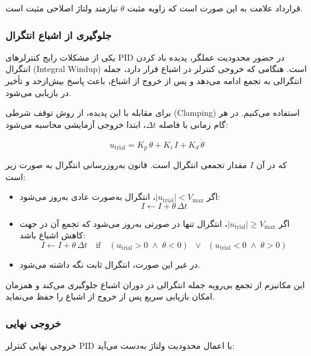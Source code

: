 قرارداد علامت به این صورت است که زاویه مثبت $\theta$ نیازمند ولتاژ اصلاحی مثبت است.

\subsubsection{جلوگیری از اشباع انتگرال}

یکی از مشکلات رایج کنترلرهای PID در حضور محدودیت عملگر، پدیده باد کردن انتگرال (Integral Windup) است. هنگامی که خروجی کنترلر در اشباع قرار دارد، جمله انتگرالی به تجمع ادامه می‌دهد و پس از خروج از اشباع، باعث پاسخ بیش‌ازحد و تأخیر در بازیابی می‌شود.

برای مقابله با این پدیده، از روش توقف شرطی (Clamping) استفاده می‌کنیم. در هر گام زمانی با فاصله $\Delta t$، ابتدا خروجی آزمایشی محاسبه می‌شود:

\begin{equation}
u_{\text{trial}} = K_p\,\theta + K_i\,I + K_d\,\dot{\theta}
\end{equation}

که در آن $I$ مقدار تجمعی انتگرال است. قانون به‌روزرسانی انتگرال به صورت زیر است:

\begin{itemize}[itemsep=2pt]
    \item اگر $|u_{\text{trial}}| < V_{\max}$، انتگرال به‌صورت عادی به‌روز می‌شود:
    \begin{equation}
    I \leftarrow I + \theta\,\Delta t
    \end{equation}
    \item اگر $|u_{\text{trial}}| \ge V_{\max}$، انتگرال تنها در صورتی به‌روز می‌شود که تجمع آن در جهت کاهش اشباع باشد:
    \begin{equation}
    I \leftarrow I + \theta\,\Delta t \quad \text{if} \quad (u_{\text{trial}} > 0 \;\wedge\; \theta < 0) \;\;\vee\;\; (u_{\text{trial}} < 0 \;\wedge\; \theta > 0)
    \end{equation}
    \item در غیر این صورت، انتگرال ثابت نگه داشته می‌شود.
\end{itemize}

این مکانیزم از تجمع بی‌رویه جمله انتگرالی در دوران اشباع جلوگیری می‌کند و همزمان امکان بازیابی سریع پس از خروج از اشباع را حفظ می‌نماید.

\subsubsection{خروجی نهایی}

خروجی نهایی کنترلر PID با اعمال محدودیت ولتاژ به‌دست می‌آید:

